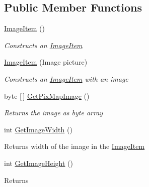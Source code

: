 \subsection*{Public Member Functions}
\begin{DoxyCompactItemize}
\item 
\mbox{\hyperlink{class_space_v_i_l_1_1_image_item_afa5bd43ca4b8994abc75f357d74fb789}{Image\+Item}} ()
\begin{DoxyCompactList}\small\item\em Constructs an \mbox{\hyperlink{class_space_v_i_l_1_1_image_item}{Image\+Item}} \end{DoxyCompactList}\item 
\mbox{\hyperlink{class_space_v_i_l_1_1_image_item_abdb9336a73b8d73c87263d65a8531276}{Image\+Item}} (Image picture)
\begin{DoxyCompactList}\small\item\em Constructs an \mbox{\hyperlink{class_space_v_i_l_1_1_image_item}{Image\+Item}} with an image \end{DoxyCompactList}\item 
byte \mbox{[}$\,$\mbox{]} \mbox{\hyperlink{class_space_v_i_l_1_1_image_item_a85be98b3558beec30a134e2da5304fd5}{Get\+Pix\+Map\+Image}} ()
\begin{DoxyCompactList}\small\item\em Returns the image as byte array \end{DoxyCompactList}\item 
\mbox{\label{class_space_v_i_l_1_1_image_item_a4b376d93461249f32521324021b4509f}} 
int \mbox{\hyperlink{class_space_v_i_l_1_1_image_item_a4b376d93461249f32521324021b4509f}{Get\+Image\+Width}} ()
\begin{DoxyCompactList}\small\item\em \begin{DoxyReturn}{Returns}
width of the image in the \mbox{\hyperlink{class_space_v_i_l_1_1_image_item}{Image\+Item}} 
\end{DoxyReturn}
\end{DoxyCompactList}\item 
\mbox{\label{class_space_v_i_l_1_1_image_item_aaf6f20ac9beb72233f9fcc46491b7e16}} 
int \mbox{\hyperlink{class_space_v_i_l_1_1_image_item_aaf6f20ac9beb72233f9fcc46491b7e16}{Get\+Image\+Height}} ()
\begin{DoxyCompactList}\small\item\em \begin{DoxyReturn}{Returns}

\end{DoxyReturn}
\end{DoxyCompactList}
\end{DoxyCompactItemize}
